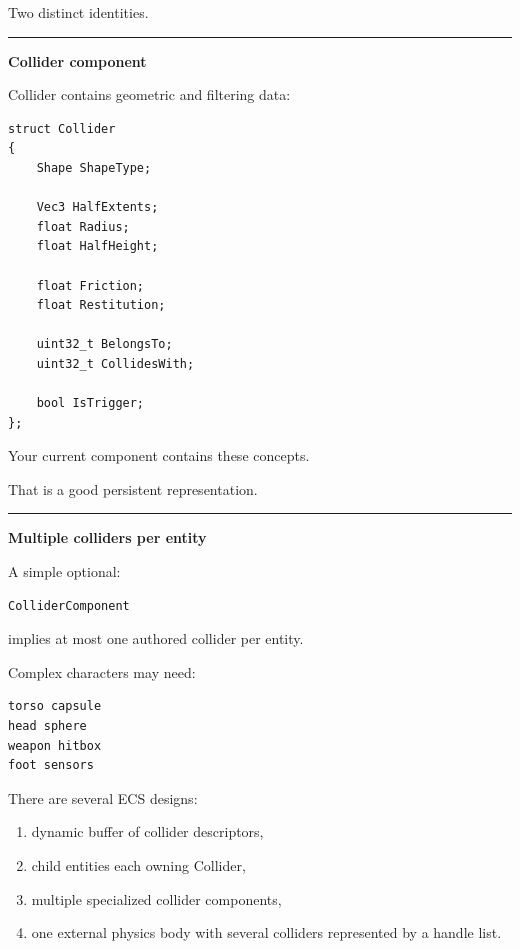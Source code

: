 Two distinct identities.

\begin{center}\rule{0.5\linewidth}{0.5pt}\end{center}

\textbf{Collider component}

Collider contains geometric and filtering data:

\begin{verbatim}
struct Collider
{
    Shape ShapeType;

    Vec3 HalfExtents;
    float Radius;
    float HalfHeight;

    float Friction;
    float Restitution;

    uint32_t BelongsTo;
    uint32_t CollidesWith;

    bool IsTrigger;
};
\end{verbatim}

Your current component contains these concepts.

That is a good persistent representation.

\begin{center}\rule{0.5\linewidth}{0.5pt}\end{center}

\textbf{Multiple colliders per entity}

A simple optional:

\begin{verbatim}
ColliderComponent
\end{verbatim}

implies at most one authored collider per entity.

Complex characters may need:

\begin{verbatim}
torso capsule
head sphere
weapon hitbox
foot sensors
\end{verbatim}

There are several ECS designs:

\begin{enumerate}
\def\labelenumi{\arabic{enumi}.}
\tightlist
\item
  dynamic buffer of collider descriptors,
\item
  child entities each owning Collider,
\item
  multiple specialized collider components,
\item
  one external physics body with several colliders represented by a handle list.
\end{enumerate}

